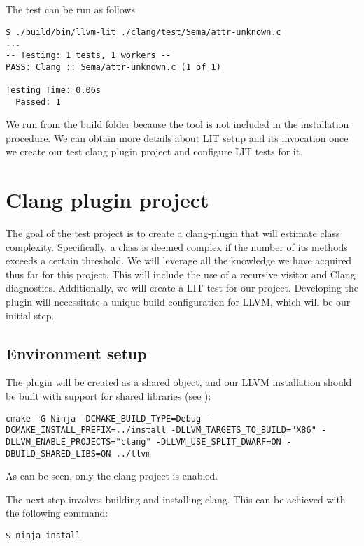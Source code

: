 The test can be run as follows
\begin{adjustwidth}{0em}{0em}
\begin{verbatim}
$ ./build/bin/llvm-lit ./clang/test/Sema/attr-unknown.c
...
-- Testing: 1 tests, 1 workers --
PASS: Clang :: Sema/attr-unknown.c (1 of 1)

Testing Time: 0.06s
  Passed: 1
\end{verbatim}
\end{adjustwidth}
We run  from the build folder because the tool is not included
in the installation procedure. We can obtain more details about LIT setup and
its invocation once we create our test clang plugin project and configure LIT
tests for it. 

\section{Clang plugin project}
\label{sec:ch4:plugin_test_project}
The goal of the test project is to create a clang-plugin that will estimate
class complexity. Specifically, a class is deemed complex if the number of its
methods exceeds a certain threshold. We will leverage all the knowledge we have
acquired thus far for this project. This will include the use of a recursive
visitor and Clang diagnostics. Additionally, we will create a LIT test for our
project. Developing the plugin will necessitate a unique build configuration for
LLVM, which will be our initial step. 

\subsection{Environment setup}
The plugin will be created as a shared object, and our LLVM
installation should be built with support for shared libraries (see
):
\begin{verbatim}
cmake -G Ninja -DCMAKE_BUILD_TYPE=Debug -DCMAKE_INSTALL_PREFIX=../install -DLLVM_TARGETS_TO_BUILD="X86" -DLLVM_ENABLE_PROJECTS="clang" -DLLVM_USE_SPLIT_DWARF=ON -DBUILD_SHARED_LIBS=ON ../llvm
\end{verbatim}
As can be seen, only the clang project is enabled.

The next step involves building and installing clang. This can be achieved with
the following command: 
\begin{adjustwidth}{0em}{0em}
\begin{verbatim}
$ ninja install
\end{verbatim}
\end{adjustwidth}

